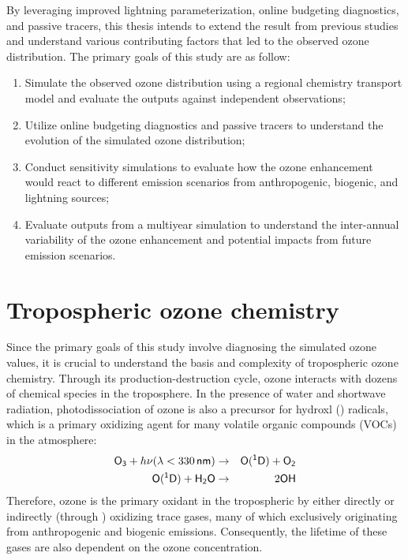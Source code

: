 By leveraging improved lightning parameterization, online budgeting diagnostics, and passive tracers, this thesis intends to extend the result from previous studies and understand various contributing factors that led to the observed ozone distribution. The primary goals of this study are as follow:

\begin{enumerate}
\item{} Simulate the observed ozone distribution using a regional chemistry transport model and evaluate the outputs against independent observations;
\item{} Utilize online budgeting diagnostics and passive tracers to understand the evolution of the simulated ozone distribution;
\item{} Conduct sensitivity simulations to evaluate how the ozone enhancement would react to different emission scenarios from anthropogenic, biogenic, and lightning sources;
\item{} Evaluate outputs from a multiyear simulation to understand the inter-annual variability of the ozone enhancement and potential impacts from future emission scenarios.
\end{enumerate}

\newpage
\section{Tropospheric ozone chemistry} \label{sec:intro/ozone}

Since the primary goals of this study involve diagnosing the simulated ozone values, it is crucial to understand the basis and complexity of tropospheric ozone chemistry. Through its production-destruction cycle, ozone interacts with dozens of chemical species in the troposphere. In the presence of water and shortwave radiation, photodissociation of ozone is also a precursor for hydroxl () radicals, which is a primary oxidizing agent for many volatile organic compounds (VOCs) in the atmosphere:
\begin{eqnarray}
	\chem{O_3} + h\nu(\lambda<330\,\unit{nm}) &\rightarrow& \chem{O(^1D)} + \chem{O_2} \label{rxn:j(o3)} \\
	\chem{O(^1D)} + \chem{H_2O} &\rightarrow& 2\chem{OH} \label{rxn:o1d+h2o}
\end{eqnarray}
Therefore, ozone is the primary oxidant in the tropospheric by either directly or indirectly (through ) oxidizing trace gases, many of which exclusively originating from anthropogenic and biogenic emissions. Consequently, the lifetime of these gases are also dependent on the ozone concentration.

